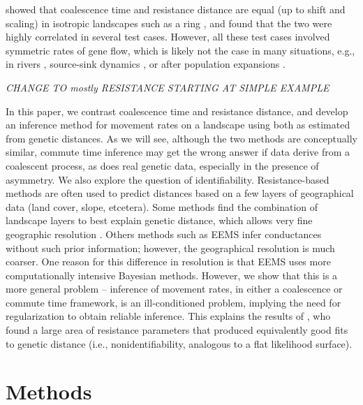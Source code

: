 \documentclass{article}
\newcommand{\plr}[1]{{\em \color{blue} #1}}
\begin{document}
\citet{mcrae2006isolation} showed that coalescence time and resistance distance are equal
(up to shift and scaling) in isotropic landscapes such as a ring \citep{matsen_wakeley},
and found that the two were highly correlated in several test cases.
However, all these test cases involved symmetric rates of gene flow,
which is likely not the case in many situations, e.g.,
in rivers \citep{morrissey2009maintenance,sundqvist2016directional,hanks2017modeling},
source-sink dynamics \citep{source_sink},
or after population expansions \citep{expansions}.

\plr{CHANGE TO mostly RESISTANCE STARTING AT SIMPLE EXAMPLE}

In this paper, we contrast 
coalescence time and resistance distance,
and develop an inference method for movement rates on a landscape
using both as estimated from genetic distances.
As we will see,
although the two methods are conceptually similar,
commute time inference may get the wrong answer if data derive from a coalescent process,
as does real genetic data, especially in the presence of asymmetry.
We also explore the question of identifiability.
Resistance-based methods are often used to predict distances based on a few layers of geographical data
(land cover, slope, etcetera).
Some methods find the combination of landscape layers to best explain genetic distance,
which allows very fine geographic resolution \citep{infer_resistance}.
Others methods such as EEMS \citep{petkova2016visualizing} infer conductances without such prior information;
however, the geographical resolution is much coarser.
One reason for this difference in resolution
is that EEMS uses more computationally intensive Bayesian methods.
However, we show that this is a more general problem --
inference of movement rates, in either a coalescence or commute time framework,
is an ill-conditioned problem,
implying the need for regularization to obtain reliable inference.
This explains the results of \citet{graves2013current},
who found a large area of resistance parameters
that produced equivalently good fits to genetic distance
(i.e., nonidentifiability, analogous to a flat likelihood surface).



\section*{Methods}
\end{document}
